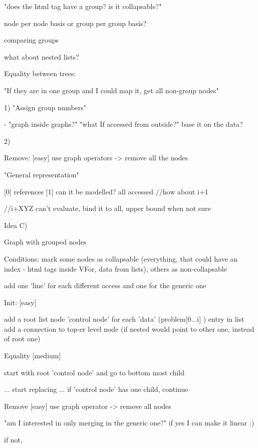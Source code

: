 "does the html tag have a group? is it collapsable?"


node per node basis or group per group basis?

comparing groups

what about nested lists?

Equality between trees:





"If they are in one group and I could map it, get all non-group nodes"


1) "Assign group numbers"

- "graph inside graphs?"
"what If accessed from outside?"
base it on the data?

2)

Remove:
[easy]
   use graph operators -> remove all the nodes
   
   
"General representation"

[0] references [1] can it be modelled?
all accessed //how about i+1

//i+XYZ can't evaluate, bind it to all, upper bound when not sure

Idea C)

Graph with grouped nodes

Conditions:
mark some nodes as collapsable (everything, that could have an index - html tags inside VFor, data from lists), others as non-collapsable

add one 'line' for each different access and one for the generic one

Init:
[easy]

add a root list node 'control node'
for each 'data' (problem[0...i] ) entry in list
add a connection to top-er level node
(if nested would point to other one, instead of root one)



Equality 
[medium]

start with root 'control node' and go to bottom most child

...
start replacing
...
if 'control node' has one child, continue

Remove
[easy]
use graph operator -> remove all nodes




"am I interested in only merging in the generic one?"
if yes I can make it linear :)

if not, 







